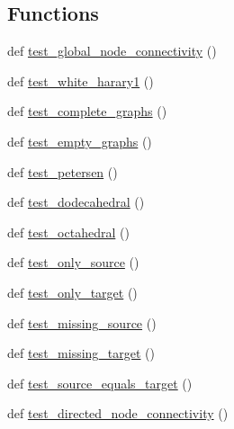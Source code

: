 \subsection*{Functions}
\begin{DoxyCompactItemize}
\item 
def \hyperlink{namespacenetworkx_1_1algorithms_1_1approximation_1_1tests_1_1test__connectivity_a40d872a77b83e8c3cb40129c4021a50c}{test\+\_\+global\+\_\+node\+\_\+connectivity} ()
\item 
def \hyperlink{namespacenetworkx_1_1algorithms_1_1approximation_1_1tests_1_1test__connectivity_a662ad2b797448a341cd5a88139f5e747}{test\+\_\+white\+\_\+harary1} ()
\item 
def \hyperlink{namespacenetworkx_1_1algorithms_1_1approximation_1_1tests_1_1test__connectivity_a4bfbea50807ab862daab0a03779fba93}{test\+\_\+complete\+\_\+graphs} ()
\item 
def \hyperlink{namespacenetworkx_1_1algorithms_1_1approximation_1_1tests_1_1test__connectivity_a01541f8450266ebddd7f1a24fac3a3f9}{test\+\_\+empty\+\_\+graphs} ()
\item 
def \hyperlink{namespacenetworkx_1_1algorithms_1_1approximation_1_1tests_1_1test__connectivity_a38f346f6cce218df615f1e8dfe0525a6}{test\+\_\+petersen} ()
\item 
def \hyperlink{namespacenetworkx_1_1algorithms_1_1approximation_1_1tests_1_1test__connectivity_a4885f31aeb1f15e4c249e2864f5da85c}{test\+\_\+dodecahedral} ()
\item 
def \hyperlink{namespacenetworkx_1_1algorithms_1_1approximation_1_1tests_1_1test__connectivity_a1396fc2858d6536b7e895e92afe72b2b}{test\+\_\+octahedral} ()
\item 
def \hyperlink{namespacenetworkx_1_1algorithms_1_1approximation_1_1tests_1_1test__connectivity_acb7bcc4ca038d77cb388c5dd9a31a882}{test\+\_\+only\+\_\+source} ()
\item 
def \hyperlink{namespacenetworkx_1_1algorithms_1_1approximation_1_1tests_1_1test__connectivity_ae2dbfa3040c4bd291808dacee2ea4002}{test\+\_\+only\+\_\+target} ()
\item 
def \hyperlink{namespacenetworkx_1_1algorithms_1_1approximation_1_1tests_1_1test__connectivity_a1dd6caf5436d3037095a16a4ac760c12}{test\+\_\+missing\+\_\+source} ()
\item 
def \hyperlink{namespacenetworkx_1_1algorithms_1_1approximation_1_1tests_1_1test__connectivity_a7aa7d06df20aa496ba708c8a3d0a3537}{test\+\_\+missing\+\_\+target} ()
\item 
def \hyperlink{namespacenetworkx_1_1algorithms_1_1approximation_1_1tests_1_1test__connectivity_a633785d72ea7340e5100b1992eaca2a7}{test\+\_\+source\+\_\+equals\+\_\+target} ()
\item 
def \hyperlink{namespacenetworkx_1_1algorithms_1_1approximation_1_1tests_1_1test__connectivity_a29632a77f94d05f9e11df015ace92a1e}{test\+\_\+directed\+\_\+node\+\_\+connectivity} ()
\end{DoxyCompactItemize}


